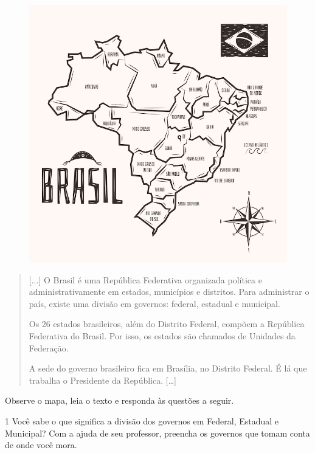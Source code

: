 \begin{figure}[htpb!]
\includegraphics[width=\textwidth]{./imgs/img46.png}
\caption{}
\end{figure}

\begin{quote}
{[}...{]} O Brasil é uma República Federativa organizada política e
administrativamente em estados, municípios e distritos. Para administrar
o país, existe uma divisão em governos: federal, estadual e municipal.

Os 26 estados brasileiros, além do Distrito Federal, compõem a República
Federativa do Brasil. Por isso, os estados são chamados de Unidades da
Federação.

A sede do governo brasileiro fica em Brasília, no Distrito Federal. É lá
que trabalha o Presidente da República. {[}\ldots{}{]}

\end{quote}\pagebreak

\noindent{}Observe o mapa, leia o texto e responda às questões a seguir.

\num{1} Você sabe o que significa a divisão dos governos em Federal, Estadual e
Municipal? Com a ajuda de seu professor, preencha os governos que tomam
conta de onde você mora.

